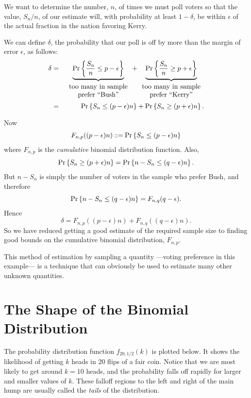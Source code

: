 \documentclass[11pt,twoside]{article}
\begin{document}
\begin{example}
We want to determine the number, $n$, of times we must poll voters so that
the value, $S_n/n$, of our estimate will, with probability at least
$1 -\delta$, be within $\epsilon$ of the actual fraction in the nation
favoring Kerry.

We can define $\delta$, the probability that our poll is off by more
than the margin of error $\epsilon$, as follows:
\begin{eqnarray*}
\delta  & = &
        \underbrace{\mathop{\textup{Pr}}\nolimits\left\{\frac{S_n}{n} \leq p - \epsilon\right\}}_{
\begin{array}{c}
\mbox{too many in sample} \\
\mbox{prefer ``Bush''}
\end{array}}
        + \underbrace{\mathop{\textup{Pr}}\nolimits\left\{\frac{S_n}{n} \geq p + \epsilon\right\}}_{
\begin{array}{c}
\mbox{too many in sample} \\
\mbox{prefer ``Kerry''}
\end{array}} \\
        & = & \mathop{\textup{Pr}}\nolimits\left\{S_n \leq (p - \epsilon) n\right\} + \mathop{\textup{Pr}}\nolimits\left\{S_n \geq (p + \epsilon) n\right\}.
\end{eqnarray*}

Now
\[
F_{n,p}((p-\epsilon)n) \mathbin{::=} \mathop{\textup{Pr}}\nolimits\left\{S_n \leq (p - \epsilon) n\right\}
\]
where $F_{n,p}$ is the \emph{cumulative} binomial distribution function.
Also,
\[
\mathop{\textup{Pr}}\nolimits\left\{S_n \geq (p + \epsilon) n\right\} = \mathop{\textup{Pr}}\nolimits\left\{n- S_n \leq (q - \epsilon)n\right\}.
\]
But $n - S_n$ is simply the number of voters in the sample who prefer
Bush, and therefore
\[
\mathop{\textup{Pr}}\nolimits\left\{n- S_n \leq (q - \epsilon)n\right\} = F_{n,q}(q - \epsilon).
\]
Hence
\begin{equation}\label{Fnpe}
\delta = F_{n,p}((p - \epsilon) n) + F_{n,q}((q - \epsilon) n).
\end{equation}
So we have reduced getting a good estimate of the required sample size to
finding good bounds on the cumulative binomial distribution, $F_{n,p}$.

\end{example}

This method of estimation by sampling a quantity ---voting preference in
this example--- is a technique that can obviously be used to estimate many
other unknown quantities.


\section{The Shape of the Binomial Distribution}

The probability distribution function $f_{20, 1/2}(k)$ is plotted below.
It shows the likelihood of getting $k$ heads in 20 flips of a fair coin.
Notice that we are most likely to get around $k = 10$ heads, and the
probability falls off rapidly for larger and smaller values of $k$.  These
falloff regions to the left and right of the main hump are usually called
the {\em tails} of the distribution.
\end{document}
